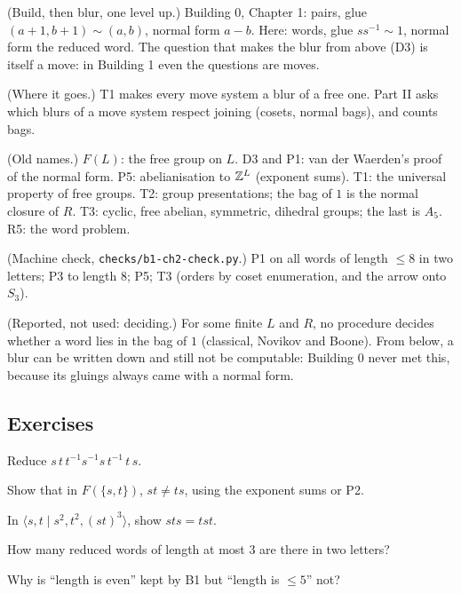 \begin{lines}
\item[\lab{R1}] (Build, then blur, one level up.) Building 0, Chapter 1: pairs, glue $(a + 1, b + 1) \sim (a, b)$, normal form $a - b$. Here: words, glue $s s^{-1} \sim 1$, normal form the reduced word. The question that makes the blur from above (D3) is itself a move: in Building 1 even the questions are moves.
\item[\lab{R2}] (Where it goes.) T1 makes every move system a blur of a free one. Part II asks which blurs of a move system respect joining (cosets, normal bags), and counts bags.
\item[\lab{R3}] (Old names.) $F(L)$: the free group on $L$. D3 and P1: van der Waerden's proof of the normal form. P5: abelianisation to $\mathbb{Z}^L$ (exponent sums). T1: the universal property of free groups. T2: group presentations; the bag of $1$ is the normal closure of $R$. T3: cyclic, free abelian, symmetric, dihedral groups; the last is $A_5$. R5: the word problem.
\item[\lab{R4}] (Machine check, \texttt{checks/b1-ch2-check.py}.) P1 on all words of length $\le 8$ in two letters; P3 to length $8$; P5; T3 (orders by coset enumeration, and the arrow onto $S_3$).
\item[\lab{R5}] (Reported, not used: deciding.) For some finite $L$ and $R$, no procedure decides whether a word lies in the bag of $1$ (classical, Novikov and Boone). From below, a blur can be written down and still not be computable: Building 0 never met this, because its gluings always came with a normal form.
\end{lines}

\subsection*{Exercises}

\begin{lines}
\item[\lab{E1}] Reduce $s\, t\, t^{-1} s^{-1} s\, t^{-1}\, t\, s$.
\item[\lab{E2}] Show that in $F(\{s, t\})$, $st \ne ts$, using the exponent sums or P2.
\item[\lab{E3}] In $\langle s, t \mid s^2, t^2, (st)^3 \rangle$, show $sts = tst$.
\item[\lab{E4}] How many reduced words of length at most $3$ are there in two letters?
\item[\lab{E5}] Why is ``length is even'' kept by B1 but ``length is $\le 5$'' not?
\end{lines}
